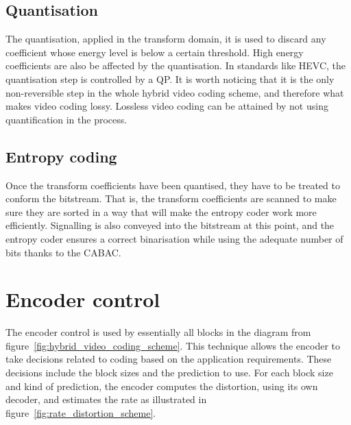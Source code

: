 \documentclass[11pt,a4paper,openright,twoside]{book}
\numberwithin{equation}{section} %
\numberwithin{figure}{section} %
\numberwithin{table}{section} %
\begin{document}
\subsection{Quantisation}
\label{sub:quantisation}

The quantisation, applied in the transform domain, it is used to discard
any coefficient whose energy level is below a certain threshold.
High energy coefficients are also be affected by the quantisation.
In standards like \acs{HEVC}, the quantisation step is controlled by a
\ac{QP}.
It is worth noticing that it is the only non-reversible step in the whole
hybrid video coding scheme, and therefore what makes video coding lossy.
Lossless video coding can be attained by not using quantification in the
process.


\subsection{Entropy coding}
\label{sub:entropy_coding}

Once the transform coefficients have been quantised, they have to be
treated to conform the bitstream.
That is, the transform coefficients are scanned to make sure they are
sorted in a way that will make the entropy coder work more efficiently.
Signalling is also conveyed into the bitstream at this point, and the
entropy coder ensures a correct binarisation while using the adequate
number of bits thanks to the \ac{CABAC}.

\section{Encoder control}
\label{sec:encoder_control}

The encoder control is used by essentially all blocks in the diagram
from figure~\ref{fig:hybrid_video_coding_scheme}.
This technique allows the encoder to take decisions related to coding
based on the application requirements.
These decisions include the block sizes and the prediction to use.
For each block size and kind of prediction, the encoder computes the
distortion, using its own decoder, and estimates the rate as illustrated
in figure~\ref{fig:rate_distortion_scheme}.
\end{document}
